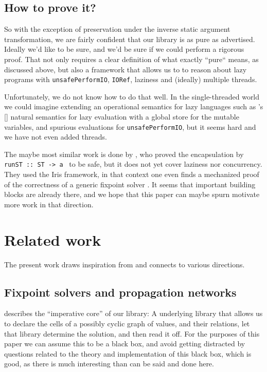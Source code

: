 \documentclass[manuscript,screen,acmsmall]{acmart}
\begin{document}
\subsection{How to prove it?}

So with the exception of preservation under the inverse static argument transformation, we are fairly confident that our library is as pure as advertised. Ideally we'd like to be sure, and we’d be sure if we could perform a rigorous proof.  That not only requires a clear definition of what exactly “pure“ means, as discussed above, but also a framework that allows us to to reason about lazy programs with \verb|unsafePerformIO|, \verb|IORef|, laziness and (ideally) multiple threads.

Unfortunately, we do not know how to do that well. In the single-threaded world we could imagine extending an operational semantics for lazy languages such as \citeauthor{launchbury}’s [\citeyear{launchbury}] natural semantics for lazy evaluation with a global store for the mutable variables, and spurious evaluations for \verb|unsafePerformIO|, but it seems hard and we have not even added threads.

The maybe most similar work is done  by \citet{runST}, who proved the encapsulation by \verb|runST :: ST -> a | to be safe, but it does not yet cover laziness nor concurrency.
They used the Iris framework, in that context one even finds a mechanized proof of the correctness of a generic fixpoint solver \citep{spygame}.
It seems that important building blocks are already there, and we hope that this paper can maybe spurn motivate more work in that direction.


\section{Related work}

The present work draws inspiration from and connects to various directions.

\subsection{Fixpoint solvers and propagation networks}

 describes the “imperative core” of our library: A underlying library that allows us to declare the cells of a possibly cyclic graph of values, and their relations, let that library determine the solution, and then read it off. For the purposes of this paper we can assume this to be a black box, and avoid getting distracted by questions related to the theory and implementation of this black box, which is good, as there is much interesting than can be said and done here.
\end{document}
